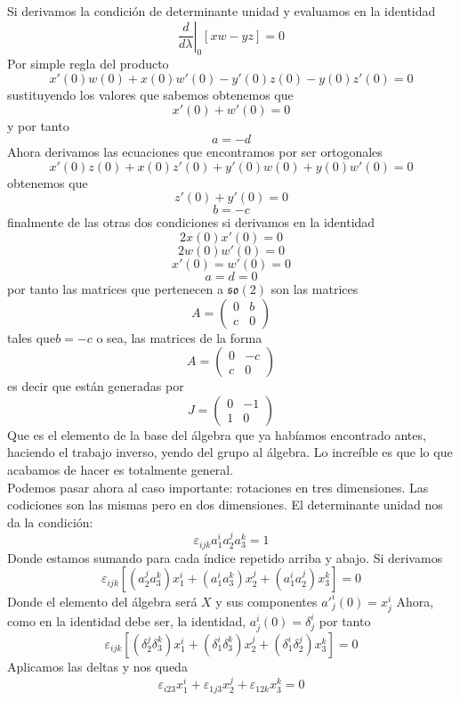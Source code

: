 \documentclass[12pt]{article}
\begin{document}
Si derivamos la condición de determinante unidad y evaluamos en la identidad 
$$\left.\frac{d}{d\lambda}\right|_{0}[xw-yz]=0 $$
Por simple regla del producto
$$x'(0)w(0)+x(0)w'(0)-y'(0)z(0)-y(0)z'(0)=0$$
sustituyendo los valores que sabemos obtenemos que 
$$x'(0)+w'(0)=0$$ y por tanto 
$$a=-d $$
Ahora derivamos las ecuaciones que encontramos por ser ortogonales
$$x'(0)z(0)+x(0)z'(0)+ y'(0)w(0)+y(0)w'(0)=0 $$
obtenemos que 
$$z'(0)+y'(0)=0$$
$$b=-c $$
finalmente de las otras dos condiciones si derivamos en la identidad 
$$2x(0)x'(0)=0 $$
$$2w(0)w'(0)=0$$
$$x'(0)=w'(0)=0 $$
$$a=d=0 $$
por tanto las matrices que pertenecen a $\mathfrak{so(2)}$ son las matrices 
$$A= \begin{pmatrix}
	0 & b \\
	c & 0
\end{pmatrix}$$ tales que$ b=-c $ o sea, las matrices de la forma
$$A= \begin{pmatrix}
	0 & -c \\
	c & 0
\end{pmatrix}$$
es decir que están generadas por  
$$J= \begin{pmatrix}
	0 & -1 \\
	1 & 0
\end{pmatrix}$$
Que es el elemento de la base del álgebra que ya habíamos encontrado antes, haciendo el trabajo inverso, yendo del grupo al álgebra. Lo increíble es que lo que acabamos de hacer es totalmente general. 
\\
Podemos pasar ahora al caso importante: rotaciones en tres dimensiones. Las codiciones son las mismas pero en dos dimensiones. El determinante unidad nos da la condición:
\begin{equation}
	\varepsilon_{ijk}a_{1}^ia_{2}^ja_{3}^k=1
\end{equation}
Donde estamos sumando para cada índice repetido arriba y abajo.
Si derivamos
\begin{equation}
	\varepsilon_{ijk}\left[(a_2^ja_3^k)x_1^i+(a_1^ia_3^k)x_2^j+(a_1^ia_2^j)x_3^k\right]=0
\end{equation}
Donde el elemento del álgebra será $X$ y sus componentes $a'^i_j(0)=x^i_j$
Ahora, como en la identidad debe ser, la identidad, $a^i_j(0)=\delta^i_j$ por tanto
\begin{equation}
	\varepsilon_{ijk}\left[(\delta_2^j\delta_3^k)x_1^i+(\delta_1^i\delta_3^k)x_2^j+(\delta_1^i\delta_2^j)x_3^k\right]=0
\end{equation}
Aplicamos las deltas y nos queda
\begin{equation}
	\varepsilon_{i23}x_1^i+\varepsilon_{1j3}x_2^j+\varepsilon_{12k}x_3^k=0
\end{equation}
\end{document}
